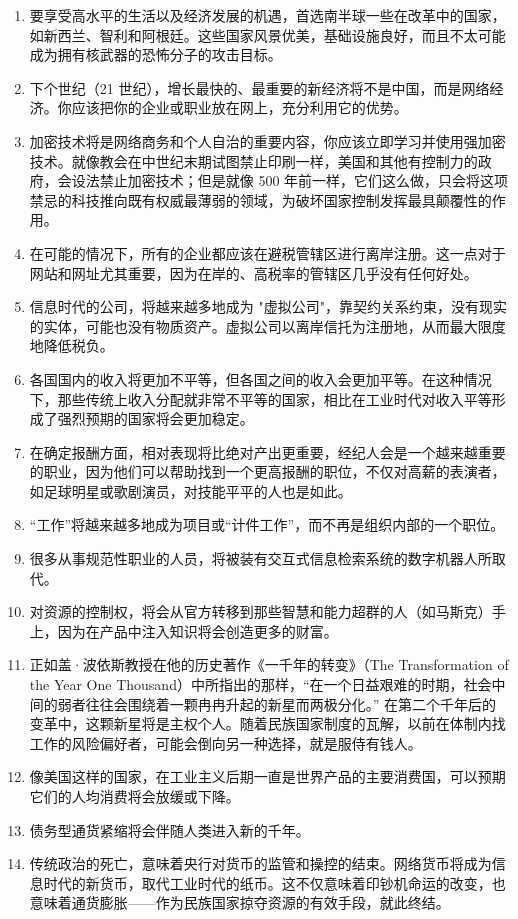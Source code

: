 \begin{enumerate}
    \item 要享受高水平的生活以及经济发展的机遇，首选南半球一些在改革中的国家，如新西兰、智利和阿根廷。这些国家风景优美，基础设施良好，而且不太可能成为拥有核武器的恐怖分子的攻击目标。
    \item 下个世纪（21 世纪），增长最快的、最重要的新经济将不是中国，而是网络经济。你应该把你的企业或职业放在网上，充分利用它的优势。
    \item 加密技术将是网络商务和个人自治的重要内容，你应该立即学习并使用强加密技术。就像教会在中世纪末期试图禁止印刷一样，美国和其他有控制力的政府，会设法禁止加密技术；但是就像 500 年前一样，它们这么做，只会将这项禁忌的科技推向既有权威最薄弱的领域，为破坏国家控制发挥最具颠覆性的作用。
    \item 在可能的情况下，所有的企业都应该在避税管辖区进行离岸注册。这一点对于网站和网址尤其重要，因为在岸的、高税率的管辖区几乎没有任何好处。
    \item 信息时代的公司，将越来越多地成为 "虚拟公司"，靠契约关系约束，没有现实的实体，可能也没有物质资产。虚拟公司以离岸信托为注册地，从而最大限度地降低税负。
    \item 各国国内的收入将更加不平等，但各国之间的收入会更加平等。在这种情况下，那些传统上收入分配就非常不平等的国家，相比在工业时代对收入平等形成了强烈预期的国家将会更加稳定。
    \item 在确定报酬方面，相对表现将比绝对产出更重要，经纪人会是一个越来越重要的职业，因为他们可以帮助找到一个更高报酬的职位，不仅对高薪的表演者，如足球明星或歌剧演员，对技能平平的人也是如此。
    \item “工作”将越来越多地成为项目或“计件工作”，而不再是组织内部的一个职位。
    \item 很多从事规范性职业的人员，将被装有交互式信息检索系统的数字机器人所取代。
    \item 对资源的控制权，将会从官方转移到那些智慧和能力超群的人（如马斯克）手上，因为在产品中注入知识将会创造更多的财富。
    \item 正如盖·波依斯教授在他的历史著作《一千年的转变》（The Transformation of the Year One Thousand）中所指出的那样，“在一个日益艰难的时期，社会中间的弱者往往会围绕着一颗冉冉升起的新星而两极分化。” 在第二个千年后的变革中，这颗新星将是主权个人。随着民族国家制度的瓦解，以前在体制内找工作的风险偏好者，可能会倒向另一种选择，就是服侍有钱人。
    \item 像美国这样的国家，在工业主义后期一直是世界产品的主要消费国，可以预期它们的人均消费将会放缓或下降。
    \item 债务型通货紧缩将会伴随人类进入新的千年。
    \item 传统政治的死亡，意味着央行对货币的监管和操控的结束。网络货币将成为信息时代的新货币，取代工业时代的纸币。这不仅意味着印钞机命运的改变，也意味着通货膨胀——作为民族国家掠夺资源的有效手段，就此终结。

\end{enumerate}
